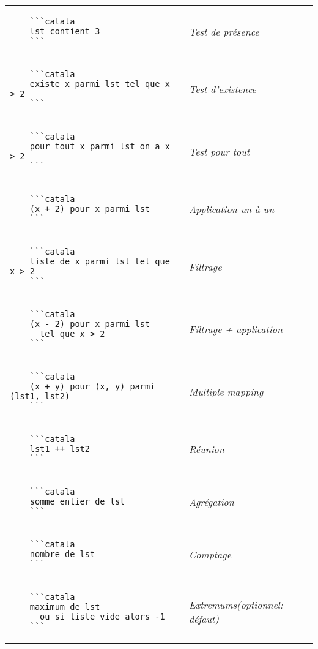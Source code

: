 \documentclass{article}
\makeatletter
\newenvironment{catala}{%
  \VerbatimEnvironment
  \let\FV@ListVSpace\relax
  \begin{verbatim}}%
 {\end{verbatim}}
\makeatother
\begin{document}
\begin{multicols}{3}
\begin{tabular}{@{}p{\cola}>{\slshape}p{\colb}@{}}
  \begin{catala}
    ```catala
    lst contient 3
    ```
  \end{catala}
  & Test de présence
  \\
  \begin{catala}
    ```catala
    existe x parmi lst tel que x > 2
    ```
  \end{catala}
  & Test d'existence
  \\
  \begin{catala}
    ```catala
    pour tout x parmi lst on a x > 2
    ```
  \end{catala}
  & Test pour tout
  \\
  \begin{catala}
    ```catala
    (x + 2) pour x parmi lst
    ```
  \end{catala}
  & Application un-à-un
  \\
  \begin{catala}
    ```catala
    liste de x parmi lst tel que x > 2
    ```
  \end{catala}
  & Filtrage
  \\
  \begin{catala}
    ```catala
    (x - 2) pour x parmi lst
      tel que x > 2
    ```
  \end{catala}
  & Filtrage + application
  \\
  \begin{catala}
    ```catala
    (x + y) pour (x, y) parmi (lst1, lst2)
    ```
  \end{catala}
  & Multiple mapping
  \\
  \begin{catala}
    ```catala
    lst1 ++ lst2
    ```
  \end{catala}
  & Réunion
  \\
  \begin{catala}
    ```catala
    somme entier de lst
    ```
  \end{catala}
  & Agrégation
  \\
  \begin{catala}
    ```catala
    nombre de lst
    ```
  \end{catala}
  & Comptage
  \\
  \begin{catala}
    ```catala
    maximum de lst
      ou si liste vide alors -1
    ```
  \end{catala}
  & Extremums\newline (optionnel: défaut)

\end{tabular}
\end{multicols}
\end{document}
